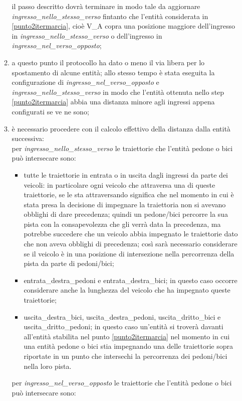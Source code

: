 \begin{enumerate}
\begin{enumerate}
il passo descritto dovrà terminare in modo tale da aggiornare \textit{ingres\-so\_nel\-lo\_stes\-so\_ver\-so} fintanto che l'entità considerata in \ref{punto2itermarcia}, cioè V\_A copra una posizione maggiore dell'ingresso in \textit{ingres\-so\_nel\-lo\_stes\-so\_ver\-so} o dell'ingresso in \textit{ingres\-so\_nel\_ver\-so\_op\-posto};
\item a questo punto il protocollo ha dato o meno il via libera per lo spostamento di alcune entità; allo stesso tempo è stata eseguita la configurazione di \textit{ingres\-so\_nel\_ver\-so\_op\-pos\-to} e \textit{ingres\-so\_nel\-lo\_stes\-so\_ver\-so} in modo che l'entità ottenuta nello step \ref{punto2itermarcia} abbia una distanza minore agli ingressi appena configurati se ve ne sono;
\item è necessario procedere con il calcolo effettivo della distanza dalla entità successiva:\\
per \textit{ingres\-so\_nel\-lo\_stes\-so\_ver\-so} le traiettorie che l'entità pedone o bici può intersecare sono:
\begin{itemize}
\item tutte le traiettorie in entrata o in uscita dagli ingressi da parte dei veicoli: in particolare ogni veicolo che attraversa una di queste traiettorie, se le sta attraversando significa che nel momento in cui è stata presa la decisione di impegnare la traiettoria non si avevano obblighi di dare precedenza; quindi un pedone/bici percorre la sua pista con la consapevolezza che gli verrà data la precedenza, ma potrebbe succedere che un veicolo abbia impegnato le traiettorie dato che non aveva obblighi di precedenza; così sarà necessario considerare se il veicolo è in una posizione di intersezione nella percorrenza della pista da parte di pedoni/bici; 
\item en\-tra\-ta\_des\-tra\_pe\-do\-ni e en\-tra\-ta\_des\-tra\_bi\-ci; in questo caso occorre considerare anche la lunghezza del veicolo che ha impegnato queste traiettorie;
\item usci\-ta\_des\-tra\_bi\-ci, usci\-ta\_des\-tra\_pe\-do\-ni, usci\-ta\_drit\-to\_bi\-ci e usci\-ta\_drit\-to\_pe\-do\-ni; in questo caso un'entità si troverà davanti all'entità stabilita nel punto \ref{punto2itermarcia} nel momento in cui una entità pedone o bici stia impegnando una delle traiettorie sopra riportate in un punto che intersechi la percorrenza dei pedoni/bici nella loro pista.
\end{itemize}
per \textit{ingres\-so\_nel\_ver\-so\_op\-pos\-to} le traiettorie che l'entità pedone o bici può intersecare sono:

\end{enumerate}
\end{enumerate}
